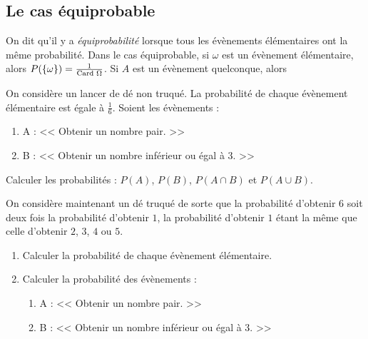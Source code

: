       \subsection*{Le cas \'equiprobable}
            On dit qu'il y a \emph{\'equiprobabilit\'e} lorsque tous les \'ev\`enements 
            \'el\'ementaires ont la m\^eme probabilit\'e.
            Dans le cas \'equiprobable, si $\omega$ est un \'ev\`enement \'el\'ementaire, alors
                  $P(\{\omega\}) = \frac{1}{\text{Card }\Omega}$.
            Si $A$ est un \'ev\`enement quelconque, alors 
            \begin{exe}\label{exe:proba-cours-1}
                        On consid\`ere un lancer de d\'e non truqu\'e.
                        La probabilit\'e de chaque \'ev\`enement \'el\'ementaire est \'egale \`a $\frac{1}{6}$.
                        Soient les \'ev\`enements : 
                              \begin{enumerate}
                                    \item A : << Obtenir un nombre pair. >>
                                    \item B : << Obtenir un nombre inf\'erieur ou \'egal \`a 3. >>
                              \end{enumerate}
                        Calculer les probabilit\'es : $P(A)$, $P(B)$, $P(A\cap B)$ et $P(A \cup B)$.
            \end{exe}
            \begin{exe}\label{exe:proba-cours-2}
                        On consid\`ere maintenant un d\'e truqu\'e de sorte que 
                              la probabilit\'e d'obtenir $6$ soit deux fois la probabilit\'e d'obtenir $1$,
                              la probabilit\'e d'obtenir $1$ \'etant la m\^eme que celle d'obtenir $2$, $3$, $4$ ou $5$.
                              \begin{enumerate}
                                    \item Calculer la probabilit\'e de chaque \'ev\`enement \'el\'ementaire.
                                    \item Calculer la probabilit\'e des \'ev\`enements :
                                          \begin{enumerate}
                                                \item A : << Obtenir un nombre pair. >>
                                                \item B : << Obtenir un nombre inf\'erieur ou \'egal \`a 3. >>
                                          \end{enumerate}
                              \end{enumerate}
            \end{exe}
